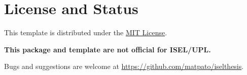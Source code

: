 \section{License and Status}
\label{sec:license}

This template is distributed under the \href{https://opensource.org/licenses/MIT}{MIT License}.

\begin{center}
	\textbf{\large This package and template are not official for ISEL/UPL.}
\end{center}

Bugs and suggestions are welcome at \url{https://github.com/matpato/iselthesis}.